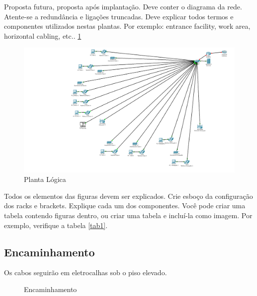 \documentclass[	DIV=calc,%
paper=a4,%
fontsize=12pt,%
onecolumn]{scrartcl}	 					%
\begin{document}
	Proposta futura, proposta após implantação.
	Deve conter o diagrama da rede. Atente-se a redundância  e ligações truncadas.
	Deve explicar todos termos e componentes utilizados nestas plantas. Por exemplo: entrance facility, work area, horizontal cabling, etc.. \ref{fig2}
	\begin{figure}
		\centering
		\includegraphics[width=\textwidth]{fig2}
		\caption{Planta Lógica}
		\label{fig2}
	\end{figure}	
	Todos os elementos das figuras devem ser explicados. 
	Crie esboço da configuração dos racks e brackets. Explique cada um dos componentes. Você pode criar uma tabela contendo figuras dentro, ou criar uma tabela e incluí-la como imagem. Por exemplo, verifique a tabela \ref{tab1}.
	
	
	
	\subsection{Encaminhamento}
	Os cabos seguirão em eletrocalhas sob o piso elevado.
	\clearpage
	\recalctypearea
	
	\begin{figure}
		\noindent{}
		\caption{Encaminhamento}
		\label{fig3}
	\end{figure}
	
\end{document}
